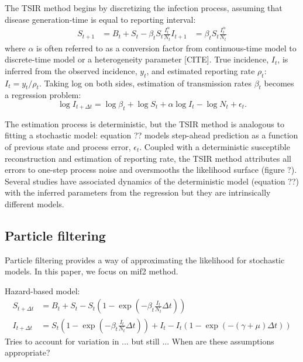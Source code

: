 \documentclass{article}
\begin{document}
The TSIR method begins by discretizing the infection process, assuming that disease generation-time is equal to reporting interval:
\begin{equation}
\begin{aligned}
S_{t+1} &= B_t + S_t - \beta_t S_t \frac{I_t^\alpha}{N_t}
I_{t+1} &= \beta_t S_t \frac{I_t^\alpha}{N_t}
\end{aligned}
\end{equation}
where $\alpha$ is often referred to as a conversion factor from continuous-time model to discrete-time model or a heterogeneity parameter [CITE].
True incidence, $I_t$, is inferred from the observed incidence, $y_t$, and estimated reporting rate $\rho_t$: $I_t = y_t/\rho_t$.
Taking log on both sides, estimation of transmission rates $\beta_t$ becomes a regression problem:
\begin{equation}
\log I_{t + \Delta t} = \log \beta_t + \log S_t + \alpha \log I_t - \log N_t + \epsilon_t.
\end{equation}

The estimation process is deterministic, but the TSIR method is analogous to fitting a stochastic model: 
equation ?? models step-ahead prediction as a function of previous state and process error, $\epsilon_t$. 
Coupled with a deterministic susceptible reconstruction and estimation of reporting rate, the TSIR method attributes all errors to one-step process noise and oversmooths the likelihood surface (figure ?).
Several studies have associated dynamics of the deterministic model (equation ??) with the inferred parameters from the regression but they are intrinsically different models.

\subsection{Particle filtering}

Particle filtering provides a way of approximating the likelihood for stochastic models.
In this paper, we focus on mif2 method.



Hazard-based model:
\begin{equation}
\begin{aligned}
S_{t + \Delta t} &= B_t + S_t - S_t \left(1- \exp\left(-\beta_t \frac{I_t}{N_t} \Delta t\right)\right)\\
I_{t + \Delta t} &= S_t \left( 1- \exp\left(-\beta_t \frac{I_t}{N_t} \Delta t\right)\right) + I_t - I_t (1 - \exp(-(\gamma + \mu) \Delta t))
\end{aligned}
\end{equation}
Tries to account for variation in ... but still ... When are these assumptions appropriate?
\end{document}

